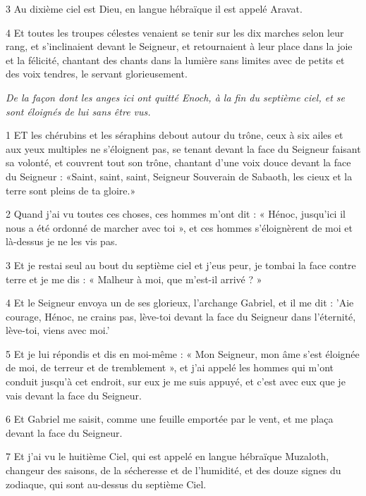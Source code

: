 \par 3 Au dixième ciel est Dieu, en langue hébraïque il est appelé Aravat.

\par 4 Et toutes les troupes célestes venaient se tenir sur les dix marches selon leur rang, et s'inclinaient devant le Seigneur, et retournaient à leur place dans la joie et la félicité, chantant des chants dans la lumière sans limites avec de petits et des voix tendres, le servant glorieusement.


\par \textit{De la façon dont les anges ici ont quitté Enoch, à la fin du septième ciel, et se sont éloignés de lui sans être vus.}

\par 1 ET les chérubins et les séraphins debout autour du trône, ceux à six ailes et aux yeux multiples ne s'éloignent pas, se tenant devant la face du Seigneur faisant sa volonté, et couvrent tout son trône, chantant d'une voix douce devant la face du Seigneur : «Saint, saint, saint, Seigneur Souverain de Sabaoth, les cieux et la terre sont pleins de ta gloire.»

\par 2 Quand j'ai vu toutes ces choses, ces hommes m'ont dit : « Hénoc, jusqu'ici il nous a été ordonné de marcher avec toi », et ces hommes s'éloignèrent de moi et là-dessus je ne les vis pas.

\par 3 Et je restai seul au bout du septième ciel et j'eus peur, je tombai la face contre terre et je me dis : « Malheur à moi, que m'est-il arrivé ? »

\par 4 Et le Seigneur envoya un de ses glorieux, l'archange Gabriel, et il me dit : 'Aie courage, Hénoc, ne crains pas, lève-toi devant la face du Seigneur dans l'éternité, lève-toi, viens avec moi.'

\par 5 Et je lui répondis et dis en moi-même : « Mon Seigneur, mon âme s'est éloignée de moi, de terreur et de tremblement », et j'ai appelé les hommes qui m'ont conduit jusqu'à cet endroit, sur eux je me suis appuyé, et c'est avec eux que je vais devant la face du Seigneur.

\par 6 Et Gabriel me saisit, comme une feuille emportée par le vent, et me plaça devant la face du Seigneur.

\par 7 Et j'ai vu le huitième Ciel, qui est appelé en langue hébraïque Muzaloth, changeur des saisons, de la sécheresse et de l'humidité, et des douze signes du zodiaque, qui sont au-dessus du septième Ciel.


